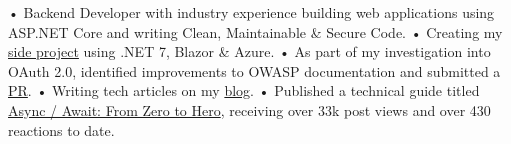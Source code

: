 

\begin{cvparagraph}

• Backend Developer with industry experience building web applications using ASP.NET Core and writing Clean, Maintainable \& Secure Code.
\newline
• Creating my \href{https://github.com/Zhiyuan-Amos/couple-management/tree/master/docs}{side project} using .NET 7, Blazor \& Azure.
\newline
• As part of my investigation into OAuth 2.0, identified improvements to OWASP documentation and submitted a \href{https://github.com/OWASP/CheatSheetSeries/issues/981}{PR}.
\newline
• Writing tech articles on my \href{https://zhiyuan-amos.github.io/blog/}{blog}.
\newline
• Published a technical guide titled \href{https://dev.to/zhiyuanamos/async-await-from-zero-to-hero-a22}{Async / Await: From Zero to Hero}, receiving over 33k post views and over 430 reactions to date.
\end{cvparagraph}